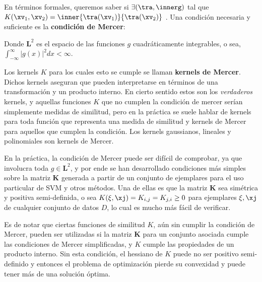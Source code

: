 En términos formales, queremos saber si $\exists (\tra, \innerg)$ tal que $K(\xv_1,\xv_2) = \inner{\tra(\xv_1)}{\tra(\xv_2)}$ . Una condición necesaria y suficiente es la \textbf{condición de Mercer}:


Donde $\mathbf{L}^2$ es el espacio de las funciones $g$ cuadráticamente integrables, o sea, $\int_{-\infty}^{\infty} |g(x)|^2 dx < \infty$. 

 Los kernels $K$ para los cuales esto se cumple se llaman \textbf{kernels de Mercer}.  Dichos kernels aseguran que pueden interpretarse en términos de una transformación y un producto interno. En cierto sentido estos son los \textit{verdaderos} kernels, y aquellas funciones $K$ que no cumplen la condición de mercer serían simplemente medidas de similitud, pero en la práctica se suele hablar de kernels para toda función que representa una medida de similitud y kernels de Mercer para aquellos que cumplen la condición. Los kernels gaussianos, lineales y polinomiales son kernels de Mercer.
 
 En la práctica, la condición de Mercer puede ser difícil de comprobar, ya que involucra toda $g \in \mathbf{L}^2$, y por ende se han desarrollado condiciones más simples sobre la matriz $\mathbf{K}$ generada a partir de un conjunto de ejemplares para el uso particular de SVM y otros métodos. Una de ellas es que la matriz $\mathbf{K}$ sea simétrica y positiva semi-definida, o sea $K(\xi,\xj)=K_{i,j}=K_{j,i} \geq 0$ para ejemplares $\xi,\xj$ de cualquier conjunto de datos $D$, lo cual es mucho más fácil de verificar.

Es de notar que ciertas funciones de similitud $K$, aún sin cumplir la condición de Mercer, pueden ser utilizadas si la matriz $\mathbf{K}$ para un conjunto asociada cumple las condiciones de Mercer simplificadas, y  $K$ cumple las propiedades de un producto interno. Sin esta condición, el hessiano de $K$ puede no ser positivo semi-definido y entonces el problema de optimización pierde su convexidad y puede tener más de una solución óptima.
  
  
